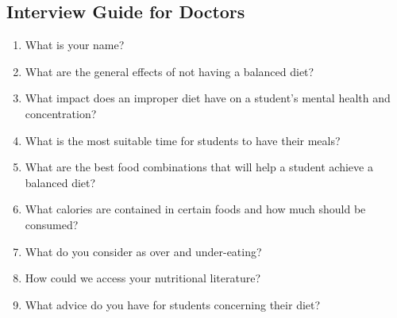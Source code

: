 \documentclass{article}
\begin{document}
\subsection{Interview Guide for Doctors}
\begin{enumerate}
\item What is your name?
\item What are the general effects of not having a balanced diet?
\item What impact does an improper diet have on a student’s mental health and concentration?
\item What is the most suitable time for students to have their meals?
\item What are the best food combinations that will help a student achieve a balanced diet?
\item What calories are contained in certain foods and how much should be consumed?
\item What do you consider as over and under-eating?
\item How could we access your nutritional literature?
\item What advice do you have for students concerning their diet?
\end{enumerate}
\end{document}

